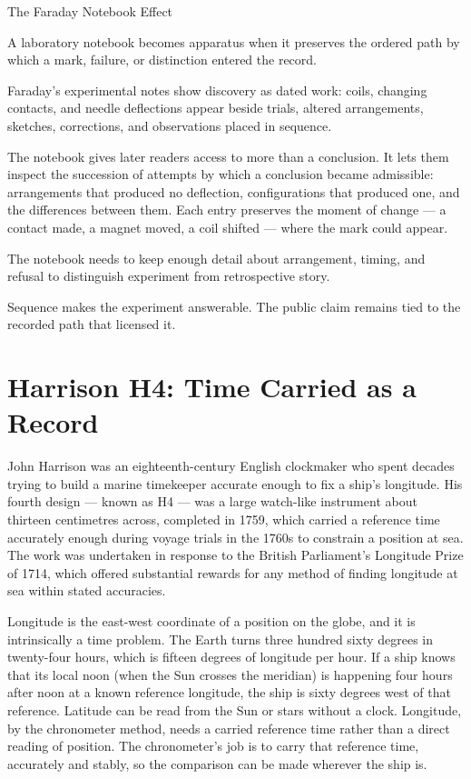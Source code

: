\begin{phenom}{The Faraday Notebook Effect~\cite{faraday1932diary}}
\label{ph:faraday-notebooks}

\PhStatement
A laboratory notebook becomes apparatus when it preserves the ordered path by
which a mark, failure, or distinction entered the record.

\PhOrigin
Faraday's experimental notes show discovery as dated work: coils, changing
contacts, and needle deflections appear beside trials, altered
arrangements, sketches, corrections, and observations placed in sequence.

\PhObservation
The notebook gives later readers access to more than a conclusion. It lets
them inspect the succession of attempts by which a conclusion became
admissible: arrangements that produced no deflection, configurations that
produced one, and the differences between them. Each entry preserves the
moment of change --- a contact made, a magnet moved, a coil shifted ---
where the mark could appear.

\PhConstraint
The notebook needs to keep enough detail about arrangement, timing, and
refusal to distinguish experiment from retrospective story.

\PhConsequence
Sequence makes the experiment answerable. The public claim remains tied to
the recorded path that licensed it.
\end{phenom}

\section{Harrison H4: Time Carried as a Record}

John Harrison was an eighteenth-century English clockmaker who spent
decades trying to build a marine timekeeper accurate enough to fix a
ship's longitude. His fourth design --- known as H4 --- was a large
watch-like instrument about thirteen centimetres across, completed in
1759, which carried a reference time accurately enough during voyage
trials in the 1760s to constrain a position at sea. The work was
undertaken in response to the British Parliament's Longitude Prize of
1714, which offered substantial rewards for any method of finding
longitude at sea within stated accuracies.

Longitude is the east-west coordinate of a position on the globe, and it
is intrinsically a time problem. The Earth turns three hundred sixty
degrees in twenty-four hours, which is fifteen degrees of longitude per
hour. If a ship knows that its local noon (when the Sun crosses the
meridian) is happening four hours after noon at a known reference
longitude, the ship is sixty degrees west of that reference. Latitude
can be read from the Sun or stars without a clock. Longitude, by the
chronometer method, needs a carried reference time rather than a direct
reading of position. The chronometer's job is to carry that reference
time, accurately and stably, so the comparison can be made wherever the
ship is.

